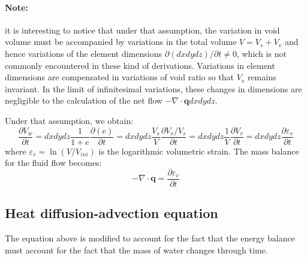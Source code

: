\documentclass[letterpaper,12pt,oneside]{report}
\begin{document}
\paragraph*{Note:} it is interesting to notice that under that assumption, the variation in void volume must be accompanied by variations in the total volume $V=V_s+V_v$ and hence variations of the element dimensions $\partial (dxdydz)/\partial t \neq 0$, which is not commonly encountered in these kind of derivations. Variations in element dimensions are compensated in variations of void ratio so that $V_s$ remains invariant. In the limit of infinitesimal variations, these changes in dimensions are negligible to the calculation of the net flow $-\nabla \cdot \bm{q} dx dy dz$.

Under that assumption, we obtain:
\begin{equation}
\frac{\partial V_w}{\partial t} = dx dy dz \frac{1}{1+e} \frac{\partial (e)}{\partial t} = dx dy dz \frac{V_s}{V} \frac{\partial V_v/V_s}{\partial t} = dx dy dz \frac{1}{V} \frac{\partial V_v}{\partial t} = dx dy dz \frac{\partial \varepsilon_v}{\partial t}
\end{equation}
where $\varepsilon_v = \ln(V/V_{ini})$ is the logarithmic volumetric strain. The mass balance for the fluid flow becomes:
\begin{equation}
-\nabla \cdot \bm{q} = \frac{\partial \varepsilon_v}{\partial t}
\end{equation}


\subsection{Heat diffusion-advection equation}

The equation above is modified to account for the fact that the energy balance must account for the fact that the mass of water changes through time.
\end{document}
